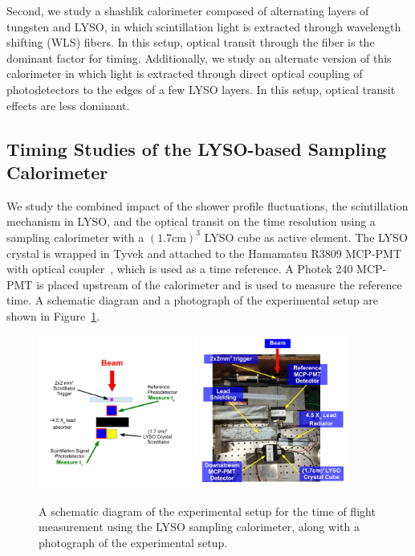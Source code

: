 \documentclass[12pt]{article}
\begin{document}
Second, we study a shashlik calorimeter composed of alternating layers of
tungsten and LYSO, in which scintillation light is extracted through wavelength
shifting (WLS) fibers. In this setup, optical transit through the fiber is the
dominant factor for timing. Additionally, we study an alternate version of this
calorimeter in which light is extracted through direct optical coupling of
photodetectors to the edges of a few LYSO layers. In this setup, optical transit
effects are less dominant.



\subsection{Timing Studies of the LYSO-based Sampling Calorimeter}

We study the combined impact of the shower profile fluctuations, the
scintillation mechanism in LYSO, and the optical transit on the time resolution
using a sampling calorimeter with a $(1.7\mathrm{cm})^{3}$ LYSO cube as active
element. The LYSO crystal is wrapped in Tyvek and attached to the Hamamatsu
R3809 MCP-PMT with optical coupler~\cite{grease}, which is used as a time reference. A Photek 240
MCP-PMT is placed upstream of the calorimeter and is used to measure the
reference time. A schematic diagram and a photograph of the experimental setup
are shown in Figure~\ref{fig:LYSOSamplingCaloSetup}. 

\begin{figure}[h] \centering
\includegraphics[width=0.45\textwidth]{figs/LYSOSamplingCaloSetupSchematic} 
\includegraphics[width=0.45\textwidth]{figs/LYSOSamplingCaloSetupPhoto} 
\caption{ A schematic diagram of the experimental setup for the
time of flight measurement using the LYSO sampling calorimeter, 
along with a photograph of the experimental setup. } 
\label{fig:LYSOSamplingCaloSetup}
\end{figure}
\end{document}
